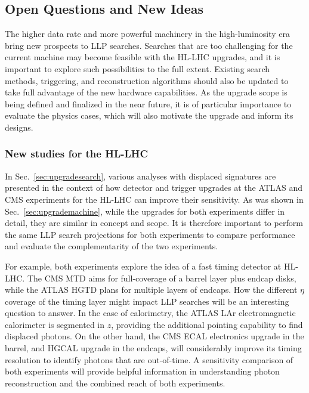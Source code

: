 \subsection{Open Questions and New Ideas}\label{sec:upgradeideas}


The higher data rate and more powerful machinery in the high-luminosity era bring new prospects to LLP searches. Searches that are too challenging for the current machine may become feasible with the HL-LHC upgrades, and it is important to explore such possibilities to the full extent. Existing search methods, triggering, and reconstruction algorithms should also be updated to take full advantage of the new hardware capabilities. As the upgrade scope is being defined and finalized in the near future, it is of particular importance to evaluate the physics cases, which will also motivate the upgrade and inform its designs.

\subsubsection{New studies for the HL-LHC}

In Sec.~\ref{sec:upgradesearch}, various analyses with displaced signatures are presented in the context of how detector and trigger upgrades at the ATLAS and CMS experiments for the HL-LHC can improve their sensitivity. As was shown in Sec.~\ref{sec:upgrademachine}, while the upgrades for both experiments differ in detail, they are similar in concept and scope. It is therefore important to perform the same LLP search projections for both experiments to compare performance and evaluate the complementarity of the two experiments.

For example, both experiments explore the idea of a fast timing detector at HL-LHC. The CMS MTD aims for full-coverage of a barrel layer plus endcap disks, while the ATLAS HGTD plans for multiple layers of endcaps. How the different $\eta$ coverage of the timing layer might impact LLP searches will be an interesting question to answer. In the case of calorimetry, the ATLAS LAr electromagnetic calorimeter is segmented in $z$, providing the additional pointing capability to find displaced photons. On the other hand, the CMS ECAL electronics upgrade in the barrel, and HGCAL upgrade in the endcaps, will considerably improve its timing resolution to identify photons that are out-of-time. A sensitivity comparison of both experiments will provide helpful information in understanding photon reconstruction and the combined reach of both experiments.

